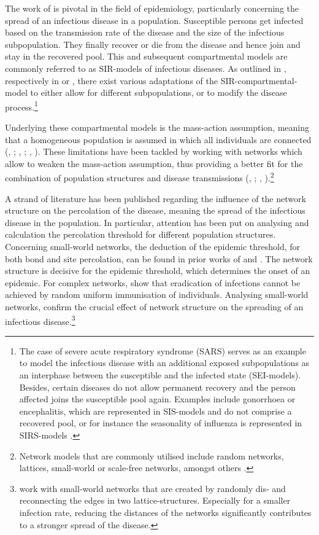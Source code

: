 \documentclass[11pt]{article}
\begin{document}
The work of \cite{kermack1927} is pivotal in the field of epidemiology, particularly concerning the spread of an infectious disease in a population. Susceptible persons get infected based on the transmission rate of the disease and the size of the infectious subpopulation. They finally recover or die from the disease and hence join and stay in the recovered pool. This and subsequent compartmental models are commonly referred to as SIR-models of infectious diseases. 
As outlined in \cite{earn2008}, respectively in \cite{dadlani2013} or \cite{sun2016}, there exist various adaptations of the SIR-compartmental-model to either allow for different subpopulations, or to modify the disease process.\footnote{The case of severe acute respiratory syndrome (SARS) serves as an example to model the infectious disease with an additional exposed subpopulations as an interphase between the susceptible and the infected state (SEI-models). Besides, certain diseases do not allow permanent recovery and the person affected joins the susceptible pool again. Examples include gonorrhoea or encephalitis, which are represented in SIS-models and do not comprise a recovered pool, or for instance the seasonality of influenza is represented in SIRS-models \citep{dadlani2013}.} 

Underlying these compartmental models is the mass-action assumption, meaning that a homogeneous population is assumed in which all individuals are connected (\citeauthor{heesterbeek2005}, \citeyear{heesterbeek2005}; \citeauthor{rusu2015}, \citeyear{rusu2015}; \citeauthor{wilson1945a}, \citeyear{wilson1945a}). These limitations have been tackled by working with networks which allow to weaken the mass-action assumption, thus providing a better fit for the combination of population structures and disease transmissions (\citeauthor{keeling2005}, \citeyear{keeling2005}; \citeauthor{meyers2005}, \citeyear{meyers2005}).\footnote{Network models that are commonly utilised include random networks, lattices, small-world or scale-free networks, amongst others \citep{keeling2005}.}    

A strand of literature has been published regarding the influence of the network structure on the percolation of the disease, meaning the spread of the infectious disease in the population. In particular, attention has been put on analysing and calculation the percolation threshold for different population structures. 
Concerning small-world networks, the deduction of the epidemic threshold, for both bond and site percolation, can be found in prior works of \cite{newman1999} and \cite{moore2000}. 
The network structure is decisive for the epidemic threshold, which determines the onset of an epidemic. For complex networks, \cite{pastor2002} show that eradication of infections cannot be achieved by random uniform immunisation of individuals. 
Analysing small-world networks, \cite{liu2015} confirm the crucial effect of network structure on the spreading of an infectious disease.\footnote{\cite{liu2015} work with small-world networks that are created by randomly dis- and reconnecting the edges in two lattice-structures. Especially for a smaller infection rate, reducing the distances of the networks significantly contributes to a stronger spread of the disease.} 
\end{document}
